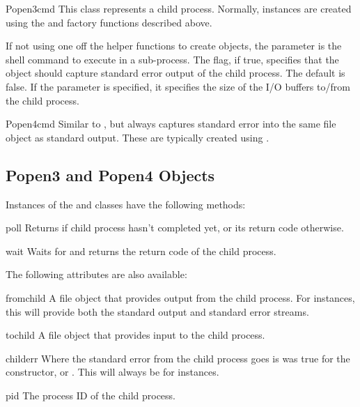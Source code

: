 \begin{classdesc}{Popen3}{cmd}
This class represents a child process.  Normally, 
instances are created using the  and
 factory functions described above.

If not using one off the helper functions to create 
objects, the parameter  is the shell command to execute in a
sub-process.  The  flag, if true, specifies that
the object should capture standard error output of the child process.
The default is false.  If the  parameter is specified, it
specifies the size of the I/O buffers to/from the child process.
\end{classdesc}

\begin{classdesc}{Popen4}{cmd}
Similar to , but always captures standard error into the
same file object as standard output.  These are typically created
using .
\end{classdesc}


\subsection{Popen3 and Popen4 Objects \label{popen3-objects}}

Instances of the  and  classes have the
following methods:

\begin{methoddesc}{poll}{}
Returns  if child process hasn't completed yet, or its return 
code otherwise.
\end{methoddesc}

\begin{methoddesc}{wait}{}
Waits for and returns the return code of the child process.
\end{methoddesc}


The following attributes are also available: 

\begin{memberdesc}{fromchild}
A file object that provides output from the child process.  For
 instances, this will provide both the standard output
and standard error streams.
\end{memberdesc}

\begin{memberdesc}{tochild}
A file object that provides input to the child process.
\end{memberdesc}

\begin{memberdesc}{childerr}
Where the standard error from the child process goes is
 was true for the constructor, or .
This will always be  for  instances.
\end{memberdesc}

\begin{memberdesc}{pid}
The process ID of the child process.
\end{memberdesc}
